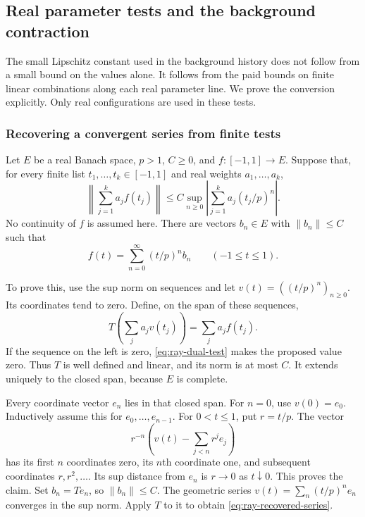 \subsection{Real parameter tests and the background contraction}
\label{sec:background-ray-estimates}
The small Lipschitz constant used in the background history does not
follow from a small bound on the values alone. It follows from the
paid bounds on finite linear combinations along each real parameter
line. We prove the conversion explicitly. Only real configurations
are used in these tests.

\subsubsection{Recovering a convergent series from finite tests}
Let $E$ be a real Banach space, $p>1$, $C\ge0$, and
$f:[-1,1]\to E$. Suppose that, for every finite list
$t_1,\ldots,t_k\in[-1,1]$ and real weights $a_1,\ldots,a_k$,
\begin{equation}\label{eq:ray-dual-test}
 \left\|\sum_{j=1}^k a_j f(t_j)\right\|
 \le C\sup_{n\ge0}\left|\sum_{j=1}^k a_j(t_j/p)^n\right|.
\end{equation}
No continuity of $f$ is assumed here. There are vectors $b_n\in E$
with $\|b_n\|\le C$ such that
\begin{equation}\label{eq:ray-recovered-series}
                    f(t)=\sum_{n=0}^\infty(t/p)^n b_n
                    \qquad(-1\le t\le1).
\end{equation}

To prove this, use the sup norm on sequences and let
$v(t)=((t/p)^n)_{n\ge0}$. Its coordinates tend to zero. Define,
on the span of these sequences,
\[
                 T\left(\sum_j a_jv(t_j)\right)=\sum_j a_jf(t_j).
\]
If the sequence on the left is zero, \eqref{eq:ray-dual-test}
makes the proposed value zero. Thus $T$ is well defined and linear,
and its norm is at most $C$. It extends uniquely to the closed
span, because $E$ is complete.

Every coordinate vector $e_n$ lies in that closed span. For $n=0$,
use $v(0)=e_0$. Inductively assume this for $e_0,\ldots,e_{n-1}$.
For $0<t\le1$, put $r=t/p$. The vector
\[
       r^{-n}\left(v(t)-\sum_{j<n}r^je_j\right)
\]
has its first $n$ coordinates zero, its $n$th coordinate one,
and subsequent coordinates $r,r^2,\ldots$. Its sup distance
from $e_n$ is $r\to0$ as $t\downarrow0$. This proves the claim.
Set $b_n=T e_n$, so $\|b_n\|\le C$. The geometric series
$v(t)=\sum_n(t/p)^ne_n$ converges in the sup norm. Apply $T$
to it to obtain \eqref{eq:ray-recovered-series}.

